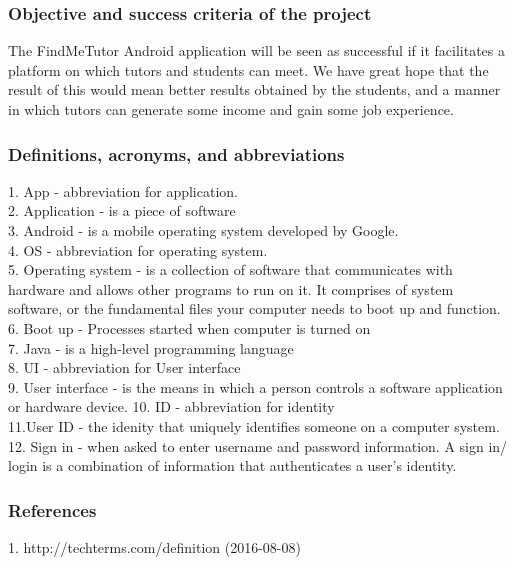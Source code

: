 \documentclass[12pt]{article}
\begin{document}
\subsubsection{Objective and success criteria of the project}
\begin{flushleft}
The FindMeTutor Android application will be seen as successful if it facilitates a platform on which tutors and students can meet. We have great hope that the result of this would mean better results obtained by the students, and a manner in which tutors can generate some income and gain some job experience. 
\end{flushleft}
\subsubsection{Definitions, acronyms, and abbreviations}
1. App - abbreviation for application. \\
2. Application - is a piece of software \\
3. Android - is a mobile operating system developed by Google. \\
4. OS - abbreviation for operating system.\\
5. Operating system - is a collection of software that communicates with hardware and allows other programs to run on it. It comprises  of system software, or the fundamental files your computer needs to boot up and function.\\
6. Boot up - Processes started when computer is turned on\\
7. Java - is a high-level programming language\\
8. UI - abbreviation for User interface\\
9. User interface - is the means in which a person controls a software application or hardware device.
10. ID - abbreviation for identity\\
11.User ID - the idenity that uniquely identifies someone on a computer system.\\
12. Sign in - when asked to enter username and password information. A sign in/ login is a combination of information that authenticates a user's identity. \\
 

\subsubsection{References}
1. http://techterms.com/definition (2016-08-08)
\end{document}
